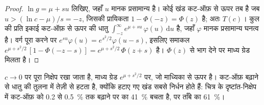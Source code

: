\begin{proof}
$\ln g = \mu + s u$ लिखिए, जहाँ $u$ मानक प्रसामान्य है। कोई खंड कट-ऑफ़ से ऊपर तब है जब $u > (\ln c -
\mu)/s = -z$, जिसकी प्रायिकता $1 - \Phi(-z) = \Phi(z)$ है; अतः $T(c)$। कुल  की प्रति इकाई
कट-ऑफ़ से ऊपर की धातु $\int_{-z}^{\infty} e^{\mu + s u}\,\varphi(u)\,\mathrm{d}u$ है,
जहाँ $\varphi$ मानक प्रसामान्य घनत्व है। वर्ग पूरा करने पर $e^{su}\varphi(u) =
e^{s^2/2}\varphi(u - s)$, इसलिए समाकल $e^{\mu + s^2/2}\,[1 - \Phi(-z - s)] = e^{\mu +
s^2/2}\,\Phi(z + s)$ है। $\Phi(z)$ से भाग देने पर माध्य ग्रेड मिलता है।
\end{proof}

$c \to 0$ पर पूरा निक्षेप रखा जाता है, माध्य ग्रेड $e^{\mu + s^2/2}$ पर, जो माध्यिका से ऊपर है। कट-ऑफ़
बढ़ाने से  धातु की तुलना में तेज़ी से हटता है, क्योंकि हटाए गए खंड सबसे निर्धन होते हैं: चित्र के
दृष्टांत-निक्षेप में कट-ऑफ़ को 0.2 से \qty{0.5}{\percent} तक बढ़ाने पर  का \qty{41}{\percent}
बचता है, पर ताँबे का \qty{61}{\percent}।

